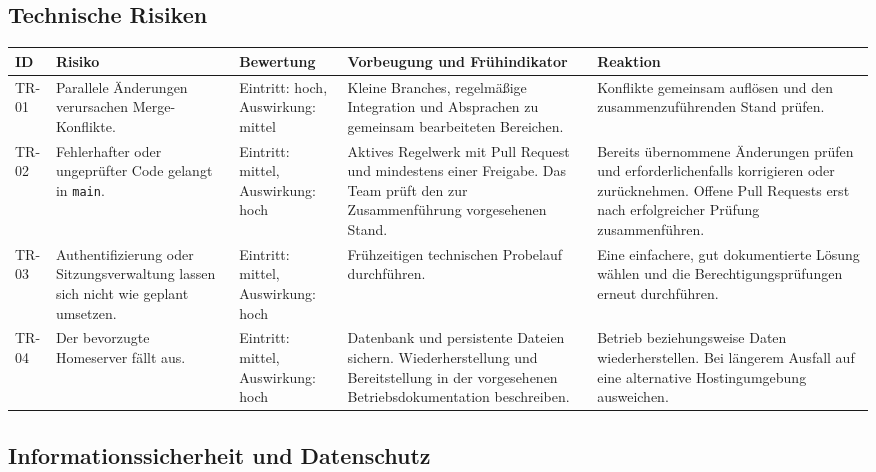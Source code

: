 \documentclass[11pt,a4paper]{article}
\begin{document}
\subsection{Technische Risiken}

\begin{tabularx}{\linewidth}{@{}l Y p{2cm} Y Y@{}}
\toprule
\textbf{ID} & \textbf{Risiko} & \textbf{Bewertung} & \textbf{Vorbeugung und Frühindikator} & \textbf{Reaktion} \\
\midrule
\endhead
TR-01 & Parallele Änderungen verursachen Merge-Konflikte. & Eintritt: hoch, Auswirkung: mittel & Kleine Branches, regelmäßige Integration und Absprachen zu gemeinsam bearbeiteten Bereichen. & Konflikte gemeinsam auflösen und den zusammenzuführenden Stand prüfen. \\
TR-02 & Fehlerhafter oder ungeprüfter Code gelangt in \texttt{main}. & Eintritt: mittel, Auswirkung: hoch & Aktives Regelwerk mit Pull Request und mindestens einer Freigabe. Das Team prüft den zur Zusammenführung vorgesehenen Stand. & Bereits übernommene Änderungen prüfen und erforderlichenfalls korrigieren oder zurücknehmen. Offene Pull Requests erst nach erfolgreicher Prüfung zusammenführen. \\
TR-03 & Authentifizierung oder Sitzungsverwaltung lassen sich nicht wie geplant umsetzen. & Eintritt: mittel, Auswirkung: hoch & Frühzeitigen technischen Probelauf durchführen. & Eine einfachere, gut dokumentierte Lösung wählen und die Berechtigungsprüfungen erneut durchführen. \\
TR-04 & Der bevorzugte Homeserver fällt aus. & Eintritt: mittel, Auswirkung: hoch & Datenbank und persistente Dateien sichern. Wiederherstellung und Bereitstellung in der vorgesehenen Betriebsdokumentation beschreiben. & Betrieb beziehungsweise Daten wiederherstellen. Bei längerem Ausfall auf eine alternative Hostingumgebung ausweichen. \\
\bottomrule
\end{tabularx}

\subsection{Informationssicherheit und Datenschutz}
\end{document}
